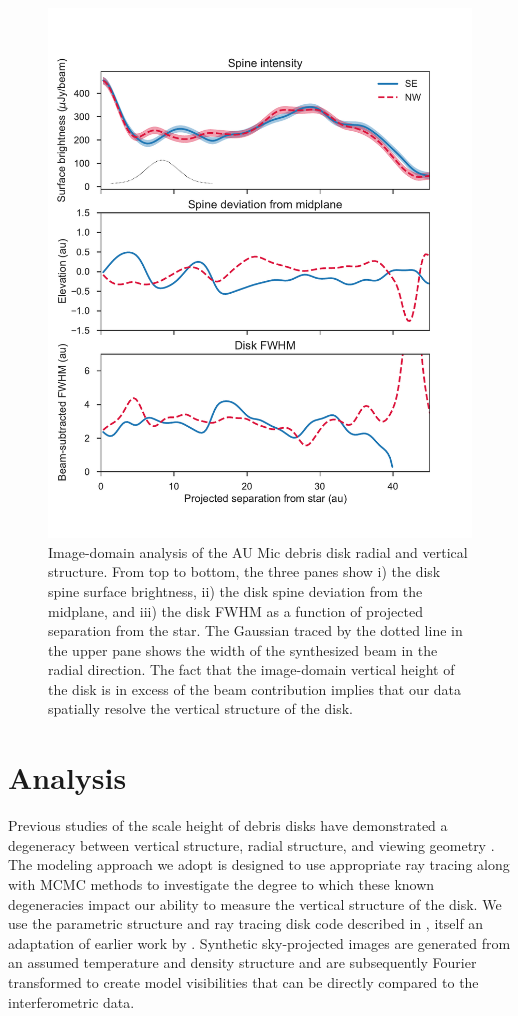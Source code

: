 \documentclass[12pt,oneside]{article}
\begin{document}
\begin{figure}
  \centering
  \includegraphics[width=.75\linewidth]{figures/boccaletti_plots}
  \caption{
  Image-domain analysis of the AU Mic debris disk radial and vertical structure. 
  From top to bottom, the three panes show i) the disk spine surface brightness, ii) the disk spine deviation from the midplane, and iii) the disk FWHM as a function of projected separation from the star. 
  The Gaussian traced by the dotted line in the upper pane shows the width of the  synthesized beam in the radial direction.
  The fact that the image-domain vertical height of the disk is in excess of the beam contribution implies that our data spatially resolve the vertical structure of the disk.} 
  \label{fig: boccaletti}
\end{figure}



\section{Analysis}
\label{section: analysis}
Previous studies of the scale height of debris disks have demonstrated a degeneracy between vertical structure, radial structure, and viewing geometry \citep[e.g.,][]{milli14}.  
The modeling approach we adopt is designed to use appropriate ray tracing along with MCMC methods to investigate the degree to which these known degeneracies impact our ability to measure the vertical structure of the disk.  
We use the parametric structure and ray tracing disk code described in \cite{flaherty15}, itself an adaptation of earlier work by \cite{rosenfeld13}.
Synthetic sky-projected images are generated from an assumed temperature and density structure and are subsequently Fourier transformed to create model visibilities that can be directly compared to the interferometric data.
\end{document}
